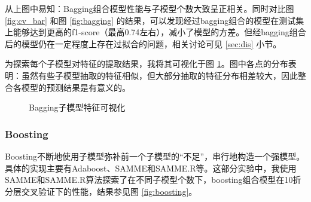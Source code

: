 \documentclass[12pt,a4paper]{article}
\theoremstyle{definition}
\begin{document}
从上图中易知：Bagging组合模型性能与子模型个数大致呈正相关。同时对比图 \ref{fig:cv_bar} 和图 \ref{fig:bagging} 的结果，可以发现经过bagging组合的模型在测试集上能够达到更高的f1-score（最高0.74左右），减小了模型的方差。但经bagging组合后的模型仍在一定程度上存在过拟合的问题，相关讨论可见 \ref{sec:dis} 小节。

\vspace{0.015\linewidth}
为探索每个子模型对特征的提取结果，我将其可视化于图 \ref{fig:bagging-feature}。图中各点的分布表明：虽然有些子模型抽取的特征相似，但大部分抽取的特征分布相差较大，因此整合各模型的预测结果是有意义的。

\begin{figure}[H]
	\centering
	\caption{Bagging子模型特征可视化}
	\label{fig:bagging-feature}
\end{figure}

\vspace{-0.05\linewidth}
\subsubsection{Boosting}
\label{sec:boosting}

Boosting不断地使用子模型弥补前一个子模型的“不足”，串行地构造一个强模型。具体的实现主要有Adaboost、SAMME和SAMME.R等。这部分实验中，我使用SAMME和SAMME.R算法探索了在不同子模型个数下，boosting组合模型在10折分层交叉验证下的性能，结果参见图 \ref{fig:boosting}。
\end{document}
